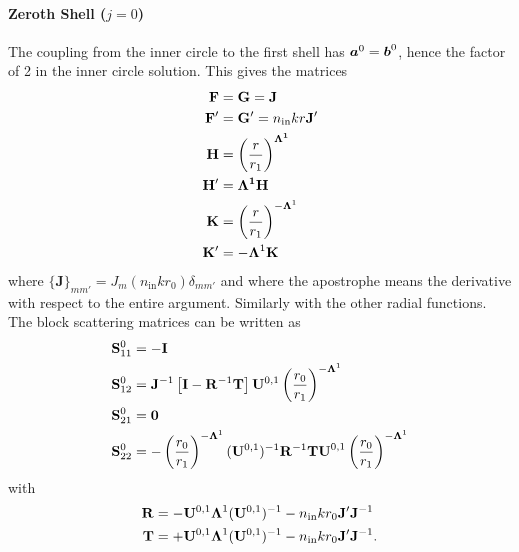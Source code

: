 \paragraph{Zeroth Shell ($j=0$)}
The coupling from the inner circle to the first shell has
$\boldsymbol{a}^0=\boldsymbol{b}^0$, hence the factor of 2 in the inner circle solution.
This gives the matrices
  \begin{align*}
    \mathbf{F}	&= \mathbf{G} = \mathbf{J}			\\
    \mathbf{F}' &= \mathbf{G}'=n_\text{in}kr\mathbf{J}'		\\
    \mathbf{H}	&= \left(\frac{r}{r_1}\right)^{\boldsymbol{\Lambda^1}}	\\
    \mathbf{H}'	&= \boldsymbol{\Lambda^1}\mathbf{H}			\\
    \mathbf{K}	&= \left(\frac{r}{r_1}\right)^{-\boldsymbol{\Lambda}^1}	\\
    \mathbf{K}'	&= -\boldsymbol{\Lambda}^1\mathbf{K}
  \end{align*}
where $\{\mathbf{J}\}_{mm'} = J_m(n_\text{in}kr_0)\delta_{mm'}$ and where the
apostrophe means the derivative with respect to the entire argument. Similarly
with the other radial functions. The block scattering
matrices can be written as
  \begin{subequations}
  \begin{align}
    \mathbf{S}^0_{11}	&= -\mathbf{I}	\\
    \mathbf{S}^0_{12}	&= \mathbf{J}^{-1}\left[\mathbf{I}-\mathbf{R}^{-1}\mathbf{T}\right]\mathbf{U}^{0,1}\left(\frac{r_0}{r_1}\right)^{-\boldsymbol{\Lambda}^1}	\\
    \mathbf{S}^0_{21}	&= \mathbf{0}	\\
    \mathbf{S}^0_{22}	&= -\left(\frac{r_0}{r_1}\right)^{-\boldsymbol{\Lambda}^1}(\mathbf{U}^{0,1})^{-1}\mathbf{R}^{-1}\mathbf{TU}^{0,1}\left(\frac{r_0}{r_1}\right)^{-\boldsymbol{\Lambda}^1}
  \end{align}
  \end{subequations}
with 
  \begin{subequations}
  \begin{align}
   \mathbf{R} &= -\mathbf{U}^{0,1}\boldsymbol{\Lambda}^1(\mathbf{U}^{0,1})^{-1}-n_\text{in}kr_0\mathbf{J}'\mathbf{J}^{-1}	\\
   \mathbf{T} &= +\mathbf{U}^{0,1}\boldsymbol{\Lambda}^1(\mathbf{U}^{0,1})^{-1}-n_\text{in}kr_0\mathbf{J}'\mathbf{J}^{-1}.
  \end{align}
  \end{subequations}

